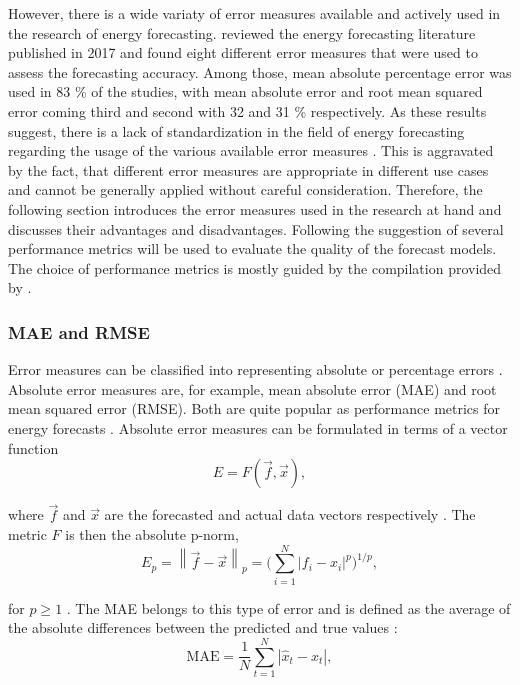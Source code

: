 However, there is a wide variaty of error measures available and actively used in the research of energy forecasting. \citet{zor:2017} reviewed the energy forecasting literature published in 2017 and found eight different error measures that were used to assess the forecasting accuracy. Among those, mean absolute percentage error was used in 83 \% of the studies, with mean absolute error and root mean squared error coming third and second with 32 and 31 \% respectively. As these results suggest, there is a lack of standardization in the field of energy forecasting regarding the usage of the various available error measures \citep{Meer:2018}. This is aggravated by the fact, that different error measures are appropriate in different use cases and cannot be generally applied without careful consideration. Therefore, the following section introduces the error measures used in the research at hand and discusses their advantages and disadvantages. Following the suggestion of \citet{Hoff:2013} several performance metrics will be used to evaluate the quality of the forecast models. The choice of performance metrics is mostly guided by the compilation provided by \citet{Meer:2018}.


\subsubsection{MAE and RMSE}

Error measures can be classified into representing absolute or percentage errors \citep{Hoff:2013}. Absolute error measures are, for example, mean absolute error (MAE) and root mean squared error (RMSE). Both are quite popular as performance metrics for energy forecasts \citep{zor:2017}. Absolute error measures can be formulated in terms of a vector function 
%
\begin{equation} \label{Eq:vectorfunction}
    E=F\left(\vec{f}, \vec{x}\right),
\end{equation}

\noindent where $\vec{f}$ and $\vec{x}$ are the forecasted and actual data vectors respectively \citep{Haben:2014}. The metric $F$ is then the absolute p-norm,
%
\begin{equation} \label{Eq:pnorm}
    E_p=\left\lVert\vec{f}-\vec{x}\right\rVert_p=\biggl(\sum_{i=1}^N \left|f_i-x_i\right|^p\biggr)^{1/p},
\end{equation}

\noindent for $p\geq1$ \citep[][p. 52]{golub:2012}. The MAE belongs to this type of error and is defined as the average of the absolute differences between the predicted and true values \citep{Hoff:2013}:
%
\begin{equation} \label{Eq:MAE}
\text{MAE}=\frac{1}{N}\sum_{t=1}^N\left|\widehat{x}_t-x_t\right|,    
\end{equation}

